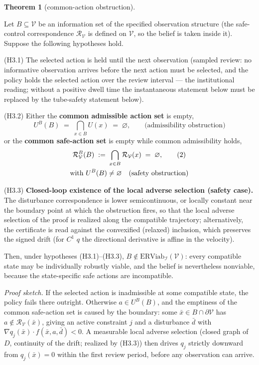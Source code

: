 \documentclass[10pt,twocolumn]{article}
\theoremstyle{definition}
\newtheorem{theorem}{Theorem}
\begin{document}
\begin{theorem}[common-action obstruction]\label{thm:common-action}

Let \(B \subseteq \mathcal{V}\) be an information set of the specified observation structure (the safe-control correspondence
\(\mathcal{R}_{\mathcal{V}}\) is defined on \(\mathcal{V}\), so the
belief is taken inside it). Suppose the following hypotheses hold.

(H3.1) The selected action is held until the next observation (sampled
review: no informative observation arrives before the next action must
be selected, and the policy holds the selected action over the review
interval --- the institutional reading; without a positive dwell time
the instantaneous statement below must be replaced by the tube-safety statement below).

(H3.2) Either the \textbf{common admissible action set} is empty,
\[U^B(B) \;=\; \bigcap_{x \in B} U(x) \;=\; \varnothing, \qquad \text{(admissibility obstruction)}\]
or the \textbf{common safe-action set} is empty while common
admissibility holds,
\begin{gather}
\mathcal{R}_{\mathcal{V}}^B(B) \;:=\; \bigcap_{x \in B} \mathcal{R}_{\mathcal{V}}(x) \;=\; \varnothing, \tag{2}\\
\text{with } U^B(B) \neq \varnothing \quad \text{(safety obstruction)} \notag
\end{gather}

(H3.3) \textbf{Closed-loop existence of the local adverse selection
(safety case).} The disturbance correspondence is lower semicontinuous,
or locally constant near the boundary point at which the obstruction
fires, so that the local adverse selection of the proof is realized
along the compatible trajectory; alternatively, the certificate is read
against the convexified (relaxed) inclusion, which preserves the
signed drift (for \(C^1\) \(q\) the directional derivative is affine in the velocity).

Then, under hypotheses (H3.1)--(H3.3),
\(B \notin \mathrm{ERViab}_{\mathcal{I}}(\mathcal{V})\): every
compatible state may be individually robustly viable, and the belief is
nevertheless nonviable, because the state-specific safe actions are
incompatible.

\end{theorem}

\emph{Proof sketch.} If the selected action is inadmissible at some compatible state, the policy fails there outright. Otherwise \(a \in U^B(B)\), and the emptiness of the common safe-action set is caused by the boundary: some \(\bar x \in B \cap \partial\mathcal{V}\) has \(a \notin \mathcal{R}_{\mathcal{V}}(\bar x)\), giving an active constraint \(j\) and a disturbance \(\bar d\) with \(\nabla q_j(\bar x) \cdot f(\bar x, a, \bar d) < 0\). A measurable local adverse selection (closed graph of \(D\), continuity of the drift; realized by (H3.3)) then drives \(q_j\) strictly downward from \(q_j(\bar x) = 0\) within the first review period, before any observation can arrive.
\end{document}
